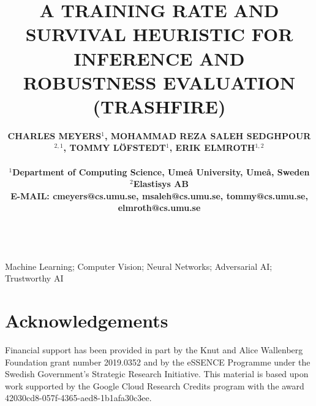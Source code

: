 \documentclass[a4paper, times, 10pt,twocolumn]{article}
\begin{document}
\title{A TRAINING RATE AND SURVIVAL HEURISTIC FOR INFERENCE AND ROBUSTNESS EVALUATION (TRASHFIRE)}
\author{\bf{\normalsize{CHARLES MEYERS${^1}$, MOHAMMAD REZA SALEH SEDGHPOUR${^{2,1}}$, TOMMY L\"{O}FSTEDT${^1}$, ERIK ELMROTH${^{1,2}}$}}\\ 
\\
\normalsize{$^1$Department of Computing Science, Ume{\aa} University, {Ume\aa}, Sweden}\\
\normalsize{$^2$Elastisys AB} \\
\normalsize{E-MAIL: cmeyers@cs.umu.se, msaleh@cs.umu.se, tommy@cs.umu.se, elmroth@cs.umu.se}\\
\\}


\maketitle \thispagestyle{empty}

\begin{keywords}
   {Machine Learning; Computer Vision; Neural Networks; Adversarial AI; Trustworthy AI}
\end{keywords}








\section*{Acknowledgements}
Financial support has been provided in part by the Knut and Alice Wallenberg Foundation grant number 2019.0352 and by the eSSENCE Programme under the Swedish Government's Strategic Research Initiative.
This material is based upon work supported by the Google Cloud Research Credits program with the award 42030cd8-057f-4365-aed8-1b1afa30c3ee.

\printbibliography
\end{document}
